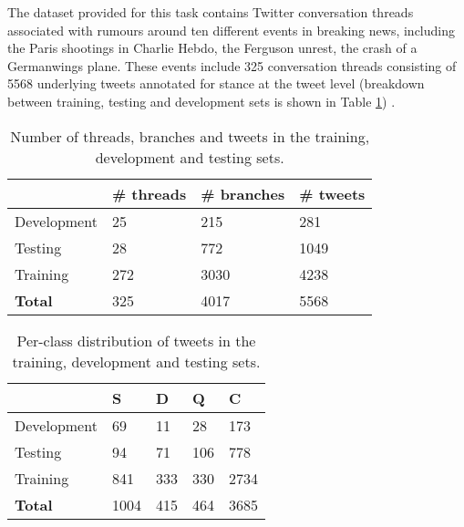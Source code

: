 \documentclass[11pt,a4paper]{article}
\begin{document}
The dataset provided for this task contains Twitter conversation threads associated with rumours around ten different events in breaking news, including the Paris shootings in Charlie Hebdo, the Ferguson unrest, the crash of a Germanwings plane.  These events include 325 conversation threads consisting of 5568 underlying tweets annotated for stance at the tweet level (breakdown between training, testing and development sets is shown in Table \ref{datastats}) \cite{taskpaper}. 
\begin{table}[th]
\centering
\footnotesize
\begin{tabular}{|l|l|l|l|}
\hline
            & \textbf{\# threads} &  \textbf{\# branches} &  \textbf{\# tweets}     \\ \hline
 Development & 25         & 215         & 281        \\ \hline
 Testing     & 28         & 772         & 1049      \\ \hline
 Training    & 272        & 3030        & 4238      \\ \hline
  \textbf{Total}       & 325        & 4017        & 5568       \\ \hline
\end{tabular}\caption{Number of threads, branches and tweets in the training, development and testing sets.}
\label{datastats}
\end{table}

\begin{table}[th]
\centering
\footnotesize
\begin{tabular}{|l|l|l|l|l|}
\hline
             &  \textbf{S}    &  \textbf{D}   &  \textbf{Q}   &  \textbf{C}    \\ \hline
 Development       & 69   & 11  & 28  & 173  \\ \hline
 Testing         & 94   & 71  & 106 & 778  \\ \hline
Training         & 841  & 333 & 330 & 2734 \\ \hline
 \textbf{Total}             & 1004 & 415 & 464 & 3685 \\ \hline
\end{tabular}\caption{Per-class distribution of tweets in the training, development and testing sets.} \vspace{-0.2cm}
\label{class}
\end{table}
\end{document}
